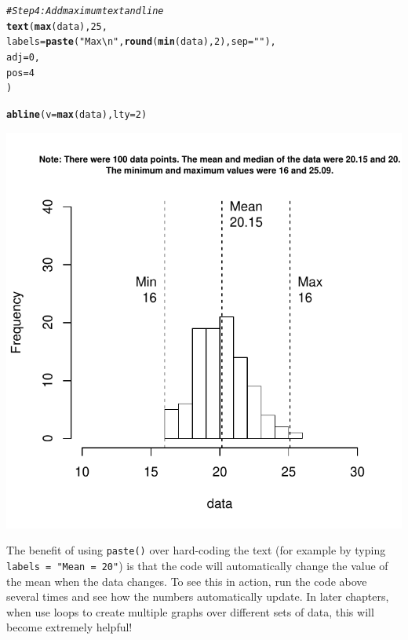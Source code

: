 \documentclass{tufte-book}\usepackage[]{graphicx}\usepackage[]{color}
\makeatletter
\def\maxwidth{ %
  \ifdim\Gin@nat@width>\linewidth
    \linewidth
  \else
    \Gin@nat@width
  \fi
}
\newcommand{\hlnum}[1]{\textcolor[rgb]{0.686,0.059,0.569}{#1}}%
\newcommand{\hlstr}[1]{\textcolor[rgb]{0.192,0.494,0.8}{#1}}%
\newcommand{\hlcom}[1]{\textcolor[rgb]{0.678,0.584,0.686}{\textit{#1}}}%
\newcommand{\hlstd}[1]{\textcolor[rgb]{0.345,0.345,0.345}{#1}}%
\newcommand{\hlkwc}[1]{\textcolor[rgb]{0.333,0.667,0.333}{#1}}%
\newcommand{\hlkwd}[1]{\textcolor[rgb]{0.737,0.353,0.396}{\textbf{#1}}}%
\newenvironment{kframe}{%
 \def\at@end@of@kframe{}%
 \ifinner\ifhmode%
  \def\at@end@of@kframe{\end{minipage}}%
  \begin{minipage}{\columnwidth}%
 \fi\fi%
 \def\FrameCommand##1{\hskip\@totalleftmargin \hskip-\fboxsep
 \colorbox{shadecolor}{##1}\hskip-\fboxsep
     \hskip-\linewidth \hskip-\@totalleftmargin \hskip\columnwidth}%
 \MakeFramed {\advance\hsize-\width
   \@totalleftmargin\z@ \linewidth\hsize
   \@setminipage}}%
 {\par\unskip\endMakeFramed%
 \at@end@of@kframe}
\newenvironment{knitrout}{}{} %
\makeatother
\begin{document}
\begin{footnotesize}
\begin{footnotesize}
\begin{knitrout}
\begin{kframe}
\begin{alltt}
\hlcom{# Step 4: Add maximum text and line}
\hlkwd{text}\hlstd{(}\hlkwd{max}\hlstd{(data),} \hlnum{25}\hlstd{,}
     \hlkwc{labels} \hlstd{=} \hlkwd{paste}\hlstd{(}\hlstr{"Max\textbackslash{}n"}\hlstd{,} \hlkwd{round}\hlstd{(}\hlkwd{min}\hlstd{(data),} \hlnum{2}\hlstd{),} \hlkwc{sep} \hlstd{=} \hlstr{""}\hlstd{),}
     \hlkwc{adj} \hlstd{=} \hlnum{0}\hlstd{,}
     \hlkwc{pos} \hlstd{=} \hlnum{4}
\hlstd{)}

\hlkwd{abline}\hlstd{(}\hlkwc{v} \hlstd{=} \hlkwd{max}\hlstd{(data),} \hlkwc{lty} \hlstd{=} \hlnum{2}\hlstd{)}
\end{alltt}
\end{kframe}
\includegraphics[width=\maxwidth]{figure/unnamed-chunk-166-1} 

\end{knitrout}
\end{footnotesize}

The benefit of using \texttt{paste()} over hard-coding the text (for example by typing \texttt{labels = "Mean = 20"}) is that the code will automatically change the value of the mean when the data changes. To see this in action, run the code above several times and see how the numbers automatically update. In later chapters, when use loops to create multiple graphs over different sets of data, this will become extremely helpful!



\end{footnotesize}
\end{document}
